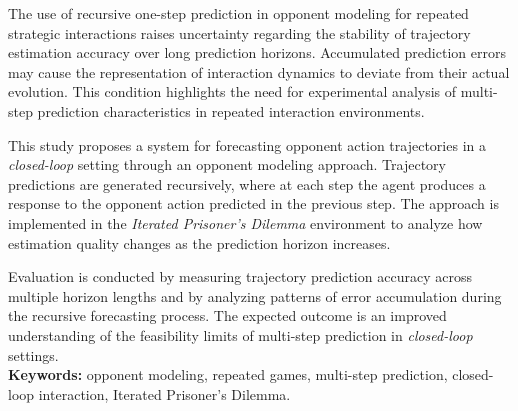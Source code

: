 \abstracteng

The use of recursive one-step prediction in opponent modeling for repeated strategic interactions raises uncertainty regarding the stability of trajectory estimation accuracy over long prediction horizons. Accumulated prediction errors may cause the representation of interaction dynamics to deviate from their actual evolution. This condition highlights the need for experimental analysis of multi-step prediction characteristics in repeated interaction environments.

This study proposes a system for forecasting opponent action trajectories in a \textit{closed-loop} setting through an opponent modeling approach. Trajectory predictions are generated recursively, where at each step the agent produces a response to the opponent action predicted in the previous step. The approach is implemented in the \textit{Iterated Prisoner's Dilemma} environment to analyze how estimation quality changes as the prediction horizon increases.

Evaluation is conducted by measuring trajectory prediction accuracy across multiple horizon lengths and by analyzing patterns of error accumulation during the recursive forecasting process. The expected outcome is an improved understanding of the feasibility limits of multi-step prediction in \textit{closed-loop} settings.\\

\noindent\textbf{Keywords:} opponent modeling, repeated games, multi-step prediction, closed-loop interaction, Iterated Prisoner's Dilemma.
\endabstracteng




